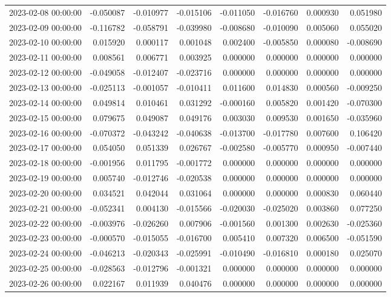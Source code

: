\begin{tabular}{lrrrrrrr}
2023-02-08 00:00:00 & -0.050087 & -0.010977 & -0.015106 & -0.011050 & -0.016760 & 0.000930 & 0.051980 \\
2023-02-09 00:00:00 & -0.116782 & -0.058791 & -0.039980 & -0.008680 & -0.010090 & 0.005060 & 0.055020 \\
2023-02-10 00:00:00 & 0.015920 & 0.000117 & 0.001048 & 0.002400 & -0.005850 & 0.000080 & -0.008690 \\
2023-02-11 00:00:00 & 0.008561 & 0.006771 & 0.003925 & 0.000000 & 0.000000 & 0.000000 & 0.000000 \\
2023-02-12 00:00:00 & -0.049058 & -0.012407 & -0.023716 & 0.000000 & 0.000000 & 0.000000 & 0.000000 \\
2023-02-13 00:00:00 & -0.025113 & -0.001057 & -0.010411 & 0.011600 & 0.014830 & 0.000560 & -0.009250 \\
2023-02-14 00:00:00 & 0.049814 & 0.010461 & 0.031292 & -0.000160 & 0.005820 & 0.001420 & -0.070300 \\
2023-02-15 00:00:00 & 0.079675 & 0.049087 & 0.049176 & 0.003030 & 0.009530 & 0.001650 & -0.035960 \\
2023-02-16 00:00:00 & -0.070372 & -0.043242 & -0.040638 & -0.013700 & -0.017780 & 0.007600 & 0.106420 \\
2023-02-17 00:00:00 & 0.054050 & 0.051339 & 0.026767 & -0.002580 & -0.005770 & 0.000950 & -0.007440 \\
2023-02-18 00:00:00 & -0.001956 & 0.011795 & -0.001772 & 0.000000 & 0.000000 & 0.000000 & 0.000000 \\
2023-02-19 00:00:00 & 0.005740 & -0.012746 & -0.020538 & 0.000000 & 0.000000 & 0.000000 & 0.000000 \\
2023-02-20 00:00:00 & 0.034521 & 0.042044 & 0.031064 & 0.000000 & 0.000000 & 0.000830 & 0.060440 \\
2023-02-21 00:00:00 & -0.052341 & 0.004130 & -0.015566 & -0.020030 & -0.025020 & 0.003860 & 0.077250 \\
2023-02-22 00:00:00 & -0.003976 & -0.026260 & 0.007906 & -0.001560 & 0.001300 & 0.002630 & -0.025360 \\
2023-02-23 00:00:00 & -0.000570 & -0.015055 & -0.016700 & 0.005410 & 0.007320 & 0.006500 & -0.051590 \\
2023-02-24 00:00:00 & -0.046213 & -0.020343 & -0.025991 & -0.010490 & -0.016810 & 0.000180 & 0.025070 \\
2023-02-25 00:00:00 & -0.028563 & -0.012796 & -0.001321 & 0.000000 & 0.000000 & 0.000000 & 0.000000 \\
2023-02-26 00:00:00 & 0.022167 & 0.011939 & 0.040476 & 0.000000 & 0.000000 & 0.000000 & 0.000000 \\

\end{tabular}
